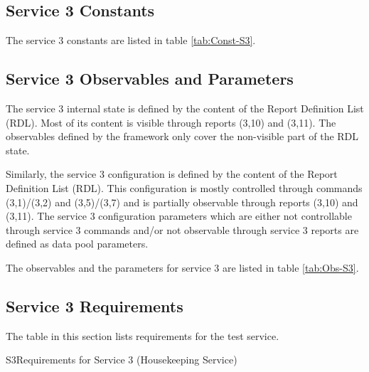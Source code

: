 \documentclass{pnp_article}
\begin{document}
\subsection{Service 3 Constants}\label{sec:serv3Const}
The service 3 constants are listed in table \ref{tab:Const-S3}.



\subsection{Service 3 Observables and Parameters}\label{sec:serv3Obs}
The service 3 internal state is defined by the content of the Report Definition List (RDL). Most of its content is visible through reports (3,10) and (3,11). The observables defined by the framework only cover the non-visible part of the RDL state. 

Similarly, the service 3 configuration is defined by the content of the Report Definition List (RDL). This configuration is mostly controlled through commands (3,1)/(3,2) and (3,5)/(3,7) and is partially observable through reports (3,10) and (3,11). The service 3 configuration parameters which are either not controllable through service 3 commands and/or not observable through service 3 reports are defined as data pool parameters. 

The observables and the parameters for service 3 are listed in table \ref{tab:Obs-S3}.


\subsection{Service 3 Requirements}
The table in this section lists requirements for the test service.

\begin{crReq}{S3}{Requirements for Service 3 (Housekeeping Service)}
\end{crReq}
\end{document}
